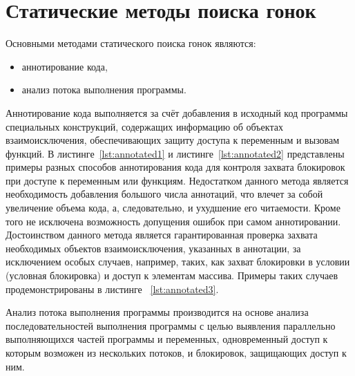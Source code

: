 \section{Статические методы поиска гонок}

Основными методами статического поиска гонок являются:

\begin{itemize}
  \item аннотирование кода,
  \item анализ потока выполнения программы.
\end{itemize}

Аннотирование кода выполняется за счёт добавления в исходный код программы специальных конструкций, содержащих информацию об объектах взаимоисключения, обеспечивающих защиту доступа к переменным и вызовам функций. В листинге~\ref{lst:annotated1} и листинге~\ref{lst:annotated2} представлены примеры разных способов аннотирования кода для контроля захвата блокировок при доступе к переменным или функциям. Недостатком данного метода является необходимость добавления большого числа аннотаций, что влечет за собой увеличение объема кода, а, следовательно, и ухудшение его читаемости. Кроме того не исключена возможность допущения ошибок при самом аннотировании. Достоинством данного метода является гарантированная проверка захвата необходимых объектов взаимоисключения, указанных в аннотации, за исключением особых случаев, например, таких, как захват блокировки в условии (условная блокировка) и доступ к элементам массива. Примеры таких случаев продемонстрированы в листинге ~\ref{lst:annotated3}.







Анализ потока выполнения программы производится на основе анализа последовательностей выполнения программы с целью выявления параллельно выполняющихся частей программы и переменных, одновременный доступ к которым возможен из нескольких потоков, и блокировок, защищающих доступ к ним.

